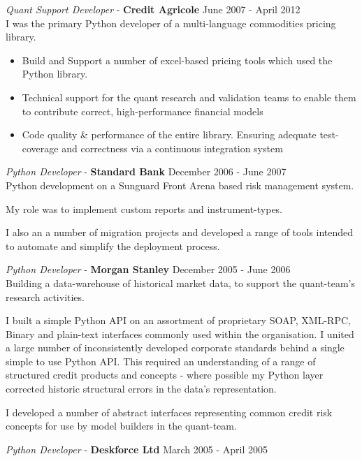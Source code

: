 \documentclass[margin, 10pt]{res} %
\begin{document}
\begin{resume}
        {\sl Quant Support Developer} - \textbf{Credit Agricole} \hfill June 2007 - April 2012 \\

        I was the primary Python developer of a multi-language commodities pricing library.

        \begin{itemize}
            \item Build and Support a number of excel-based pricing tools which used the Python library.
            \item Technical support for the quant research and validation teams to enable them to contribute correct, high-performance financial models
            \item Code quality \& performance of the entire library. Ensuring adequate test-coverage and correctness via a continuous integration system
        \end{itemize}

        {\sl Python Developer} - \textbf{Standard Bank} \hfill December 2006 - June 2007\\

        Python development on a Sunguard Front Arena based risk management system.

        My role was to implement custom reports and instrument-types.

        I also an a number of migration projects and developed a range of tools intended to automate and simplify the deployment process.

        {\sl Python Developer} - \textbf{Morgan Stanley} \hfill December 2005 - June 2006\\


        Building a data-warehouse of historical market data, to support the quant-team's research activities.

        I built a simple Python API on an assortment of proprietary SOAP, XML-RPC, Binary and plain-text interfaces commonly used within the organisation. I united a large number of inconsistently developed corporate standards behind a single simple to use Python API. This required an understanding of a range of structured credit products and concepts - where possible my Python layer corrected historic structural errors in the data's representation.

        I developed a number of abstract interfaces representing common credit risk concepts for use by model builders in the quant-team.

        {\sl Python Developer} - \textbf{Deskforce Ltd} \hfill March 2005 - April 2005\\


\end{resume}
\end{document}
